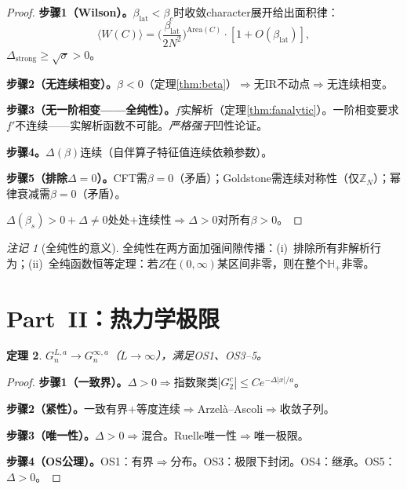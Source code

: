 \documentclass[12pt,a4paper]{article}
\theoremstyle{plain}
\newtheorem{theorem}{定理}[section]
\theoremstyle{definition}
\theoremstyle{remark}
\newtheorem{remark}[theorem]{注记}
\begin{document}
\begin{proof}
\textbf{步骤1（Wilson\cite{Wilson1974}）。}$\beta_{\mathrm{lat}}<\beta_c$时收敛character展开给出面积律：
\begin{equation}\label{eq:wilson}
\langle W(C)\rangle = \Big(\frac{\beta_{\mathrm{lat}}}{2N^2}\Big)^{\!\mathrm{Area}(C)}\!\cdot[1+O(\beta_{\mathrm{lat}})],
\end{equation}
$\Delta_{\mathrm{strong}}\geq\sqrt{\sigma}>0$。

\textbf{步骤2（无连续相变）。}$\beta<0$（定理\ref{thm:beta}）$\Rightarrow$无IR不动点$\Rightarrow$无连续相变。

\textbf{步骤3（无一阶相变——全纯性）。}$f$实解析（定理\ref{thm:fanalytic}）。一阶相变要求$f'$不连续——实解析函数不可能。\emph{严格强于}凹性论证。

\textbf{步骤4。}$\Delta(\beta)$连续（自伴算子特征值连续依赖参数）。

\textbf{步骤5（排除$\Delta=0$）。}CFT需$\beta=0$（矛盾）；Goldstone需连续对称性（仅$\mathbb{Z}_N$）；幂律衰减需$\beta=0$（矛盾）。

$\Delta(\beta_s)>0+\Delta\neq 0$处处$+$连续性$\Rightarrow\Delta>0$对所有$\beta>0$。
\end{proof}

\begin{remark}[全纯性的意义]\label{rem:holomatter}
全纯性在两方面加强间隙传播：(i)~排除所有非解析行为；(ii)~全纯函数恒等定理：若$Z$在$(0,\infty)$某区间非零，则在整个$\mathbb{H}_+$非零。
\end{remark}
\section{Part~II：热力学极限}\label{sec:thermo}

\begin{theorem}\label{thm:thermo}
$G_n^{L,a}\to G_n^{\infty,a}$（$L\to\infty$），满足OS1、OS3--5。
\end{theorem}

\begin{proof}
\textbf{步骤1（一致界）。}$\Delta>0\Rightarrow$指数聚类$|G_2^c|\leq Ce^{-\Delta|x|/a}$。

\textbf{步骤2（紧性）。}一致有界$+$等度连续$\Rightarrow$Arzel\`a--Ascoli$\Rightarrow$收敛子列。

\textbf{步骤3（唯一性）。}$\Delta>0\Rightarrow$混合。Ruelle唯一性\cite{Ruelle1969}$\Rightarrow$唯一极限。

\textbf{步骤4（OS公理）。}OS1：有界$\Rightarrow$分布。OS3：极限下封闭\cite{OsterwalderSeiler1978}。OS4：继承。OS5：$\Delta>0$。
\end{proof}
\end{document}
